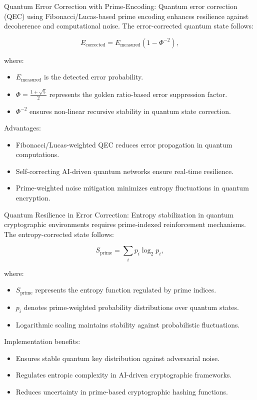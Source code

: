 \pa Quantum Error Correction with Prime-Encoding: Quantum error correction (QEC) using Fibonacci/Lucas-based prime encoding enhances resilience against decoherence and computational noise. The error-corrected quantum state follows:

\begin{equation}
E_{\text{corrected}} = E_{\text{measured}}(1 - \Phi^{-2}),
\end{equation}

where:
\begin{itemize}
    \item $E_{\text{measured}}$ is the detected error probability.
    \item $\Phi = \frac{1+\sqrt{5}}{2}$ represents the golden ratio-based error suppression factor.
    \item $\Phi^{-2}$ ensures non-linear recursive stability in quantum state correction.
\end{itemize}

Advantages:
\begin{itemize}
    \item Fibonacci/Lucas-weighted QEC reduces error propagation in quantum computations.
    \item Self-correcting AI-driven quantum networks ensure real-time resilience.
    \item Prime-weighted noise mitigation minimizes entropy fluctuations in quantum encryption.
\end{itemize}

\pa Quantum Resilience in Error Correction: Entropy stabilization in quantum cryptographic environments requires prime-indexed reinforcement mechanisms. The entropy-corrected state follows:

\begin{equation}
S_{\text{prime}} = \sum_{i} p_i \log_2 p_i,
\end{equation}

where:
\begin{itemize}
    \item $S_{\text{prime}}$ represents the entropy function regulated by prime indices.
    \item $p_i$ denotes prime-weighted probability distributions over quantum states.
    \item Logarithmic scaling maintains stability against probabilistic fluctuations.
\end{itemize}

Implementation benefits:
\begin{itemize}
    \item Ensures stable quantum key distribution against adversarial noise.
    \item Regulates entropic complexity in AI-driven cryptographic frameworks.
    \item Reduces uncertainty in prime-based cryptographic hashing functions.
\end{itemize}

